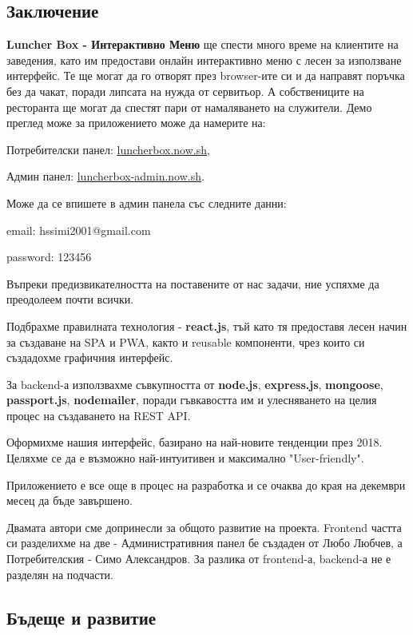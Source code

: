 \documentclass[a4paper]{article}
\begin{document}
\begin{Large}
\section{Заключение}

\textbf{Luncher Box - Интерактивно Меню} ще спести много време на клиентите на заведения, като им предостави онлайн интерактивно меню с лесен за използване интерфейс.  Те ще могат да го отворят през browser-ите си и да направят поръчка без да чакат, поради липсата на нужда от сервитьор. А собствениците на ресторанта ще могат да спестят пари от намаляването на служители. Демо преглед може за приложението може да намерите на: 

Потребителски панел: \href{https://luncherbox.now.sh}{\underline{luncherbox.now.sh}}, 

Админ панел: \href{https://luncherbox-admin.now.sh}{\underline{luncherbox-admin.now.sh}}. 

Може да се впишете в админ панела със следните данни: 

email: hssimi2001@gmail.com 

password: 123456

Въпреки предизвикателността на поставените от нас задачи, ние успяхме да преодолеем почти всички. 

Подбрахме правилната технология - \textbf{react.js}, тъй като тя предоставя лесен начин за създаване на SPA и PWA, както и reusable компоненти, чрез които си създадохме графичния интерфейс. 

За backend-а използвахме съвкупността от  \textbf{node.js}, \textbf{express.js}, \textbf{mongoose}, \textbf{passport.js}, \textbf{nodemailer}, поради гъвкавостта им и улесняването на целия процес на създаването на REST API. 

Оформихме нашия интерфейс, базирано на най-новите тенденции през 2018. Целяхме се да е възможно най-интуитивен и максимално "User-friendly".

Приложението е все още в процес на разработка и се очаква до края на декември месец да бъде завършено. 

Двамата автори сме допринесли за общото развитие на проекта. Frontend частта си разделихме на две - Административния панел бе създаден от Любо Любчев, а Потребителския - Симо Александров. За разлика от frontend-а, backend-а не е разделян на подчасти.

\subsection{Бъдеще и развитие}


\end{Large}
\end{document}
